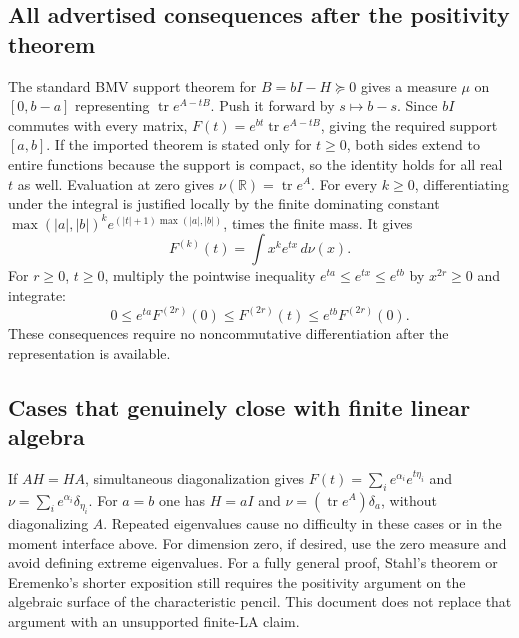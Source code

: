 \documentclass[11pt,a4paper]{article}
\newcommand{\R}{\mathbb R}
\DeclareMathOperator{\tr}{tr}
\begin{document}
\subsection{All advertised consequences after the positivity theorem}
The standard BMV support theorem for $B=bI-H\succeq0$ gives a measure
$\mu$ on $[0,b-a]$ representing $\tr e^{A-tB}$. Push it forward by
$s\mapsto b-s$. Since $bI$ commutes with every matrix,
$F(t)=e^{bt}\tr e^{A-tB}$, giving the required support $[a,b]$.
If the imported theorem is stated only for $t\ge0$, both sides extend
to entire functions because the support is compact, so the identity
holds for all real $t$ as well. Evaluation at zero gives
$\nu(\R)=\tr e^A$.
For every $k\ge0$, differentiating under the integral is justified locally
by the finite dominating constant
$\max(|a|,|b|)^k e^{(|t|+1)\max(|a|,|b|)}$, times the finite mass.
It gives
\[
 F^{(k)}(t)=\int x^ke^{tx}\,d\nu(x).
\]
For $r\ge0$, $t\ge0$, multiply the pointwise inequality
$e^{ta}\le e^{tx}\le e^{tb}$ by $x^{2r}\ge0$ and integrate:
\[
 0\le e^{ta}F^{(2r)}(0)\le F^{(2r)}(t)
                  \le e^{tb}F^{(2r)}(0).
\]
These consequences require no noncommutative differentiation after the
representation is available.

\subsection{Cases that genuinely close with finite linear algebra}
If $AH=HA$, simultaneous diagonalization gives
$F(t)=\sum_i e^{\alpha_i}e^{t\eta_i}$ and
$\nu=\sum_i e^{\alpha_i}\delta_{\eta_i}$.
For $a=b$ one has $H=aI$ and
$\nu=(\tr e^A)\delta_a$, without diagonalizing $A$.
Repeated eigenvalues cause no difficulty in these cases or in the moment
interface above. For dimension zero, if desired, use the zero measure
and avoid defining extreme eigenvalues.
For a fully general proof, Stahl's theorem or Eremenko's shorter exposition
still requires the positivity argument on the algebraic surface of the
characteristic pencil. This document does not replace that argument with
an unsupported finite-LA claim.
\end{document}
